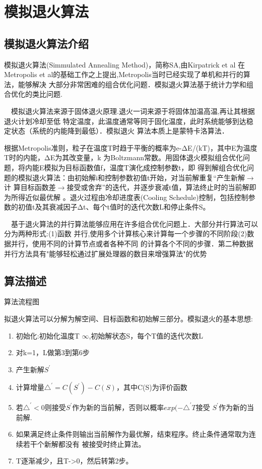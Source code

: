 
\chapter[模拟退火算法]{模拟退火算法}
\section{模拟退火算法介绍}
  模拟退火算法(Simmulated Annealing Method)，简称SA,由Kirpatrick et al\cite{obsa}
在Metropolis et al的基础工作之上提出,Metropolis当时已经实现了单机和并行的算法，能够解决
大部分非常困难的组合优化问题．模拟退火算法基于统计力学和组合优化的类比问题.

　模拟退火算法来源于固体退火原理.退火一词来源于将固体加温高温,再让其根据退火计划冷却至低
特定温度，此温度通常等同于固化温度，此时系统能够到达稳定状态（系统的内能降到最低）．模拟退火
算法本质上是蒙特卡洛算法．

  根据Metropolis准则，粒子在温度T时趋于平衡的概率为e-ΔE/(kT)，其中E为温度T时的内能，ΔE为其改变量，k
为Boltzmann常数。用固体退火模拟组合优化问题，将内能E模拟为目标函数值f，温度T演化成控制参数t，即
得到解组合优化问题的模拟退火算法：由初始解i和控制参数初值t开始，对当前解重复“产生新解$\rightarrow$计
算目标函数差$\rightarrow$接受或舍弃”的迭代，并逐步衰减t值，算法终止时的当前解即为所得近似最优解
。退火过程由冷却进度表(Cooling Schedule)控制，包括控制参数的初值t及其衰减因子Δt、每个t值时的迭代次数L和停止条件S。 

　基于退火算法的并行算法能够应用在许多组合优化问题上．大部分并行算法可以分为两种形式:(1)函数
并行,使用多个计算核心来计算每一个步骤的不同阶段(2)数据并行，使用不同的计算节点或者各种不同
的计算各个不同的步骤．第二种数据并行方法具有"能够轻松通过扩展处理器的数目来增强算法"的优势


\section{算法描述}
算法流程图

拟退火算法可以分解为解空间、目标函数和初始解三部分。模拟退火的基本思想:
\begin{enumerate}
\item 初始化:初始化温度T $\infty$,初始解状态S，每个T值的迭代次数L
\item  对k=1，L做第3到第6步
\item  产生新解$S^{'}$
\item  计算增量$\triangle^{'}=C(S^{'})-C(S)$，其中C(S)为评价函数
\item  若$\triangle^{'}<0$则接受$S^{'}$作为新的当前解，否则以概率$exp(-\triangle^{'}T$接受
$S^{'}$作为新的当前解.
\item  如果满足终止条件则输出当前解作为最优解，结束程序。终止条件通常取为连续若干个新解都没有
被接受时终止算法。
\item  T逐渐减少，且T->0，然后转第2步。
\end{enumerate}


